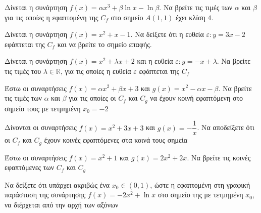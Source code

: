 \documentclass{presentation}
\begin{document}
\begin{askisi}
  Δίνεται η συνάρτηση $f(x)=αx^3+β\ln x-\ln β$. Να βρείτε τις τιμές των $α$ και $β$ για τις οποίες η εφαπτομένη της $C_f$ στο σημείο $Α(1,1)$ έχει κλίση $4$.

\end{askisi}

\begin{askisi}
  Δίνεται η συνάρτηση $f(x)=x^2+x-1$. Να δείξετε ότι η ευθεία $ε:y=3x-2$ εφάπτεται της $C_f$ και να βρείτε το σημείο επαφής.

\end{askisi}

\begin{askisi}
  Δίνεται η συνάρτηση $f(x)=x^2+λx+2$ και η ευθεία $ε:y=-x+λ$. Να βρείτε τις τιμές του $λ\in\mathbb{R}$, για τις οποίες η ευθεία $ε$ εφάπτεται της $C_f$

\end{askisi}

\begin{askisi}
  Έστω οι συναρτήσεις $f(x)=αx^2+βx+3$ και $g(x)=x^2-αx-β$. Να βρείτε τις τιμές των $α$ και $β$ για τις οποίες οι $C_f$ και $C_g$ να έχουν κοινή εφαπτόμενη στο σημείο τους με τετμημένη $x_0=-2$

\end{askisi}

\begin{askisi}
  Δίνονται οι συναρτήσεις $f(x)=x^2+3x+3$ και $g(x)=-\dfrac{1}{x}$. Να αποδείξετε ότι οι $C_f$ και $C_g$ έχουν κοινές εφαπτόμενες στα κοινά τους σημεία

\end{askisi}

\begin{askisi}
  Έστω οι συναρτήσεις $f(x)=x^2+1$ και $g(x)=2x^2+2x$. Να βρείτε τις κοινές εφαπτόμενες των $C_f$ και $C_g$

\end{askisi}

\begin{askisi}
  Να δείξετε ότι υπάρχει ακριβώς ένα $x_0\in (0,1)$, ώστε η εφαπτομένη στη γραφική παράσταση της συνάρτησης $f(x)=-2x^2+\ln x$ στο σημείο της με τετμημένη $x_0$, να διέρχεται από την αρχή των αξόνων

\end{askisi}
\end{document}
